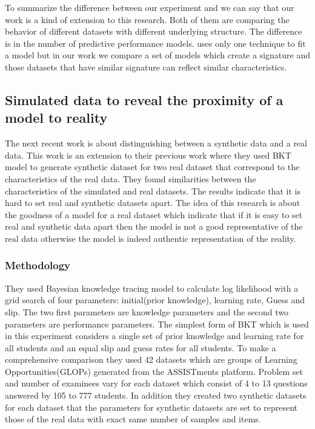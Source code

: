 To summarize the difference between our experiment and \citep{Desmarais2010} we can say that our work is a kind of extension to this research. Both of them are comparing the behavior of different datasets with different underlying structure. The difference is in the number of predictive performance models. \citet{Desmarais2010} uses only one technique to fit a model but in our work we compare a set of models which create a signature and those datasets that have similar signature can reflect similar characteristics.

\subsection{Simulated data to reveal the proximity of a model to reality}

The next recent work \citep{Rosenberg2015} is about distinguishing between a synthetic data and a real data. This work is an extension to their previous work \citep{Rosenberg2014} where they used BKT model to generate synthetic dataset for two real dataset that correspond to the characteristics of the real data. They found similarities between the characteristics of the simulated and real datasets. The results indicate that it is hard to set real and synthetic datasets apart. The idea of this research \citep{Rosenberg2015} is about the goodness of a model for a real dataset which indicate that if it is easy to set real and synthetic data apart then the model is not a good representative of the real data otherwise the model is indeed authentic representation of the reality.

\subsubsection{Methodology}
They used Bayesian knowledge tracing model to calculate log likelihood with a grid search of four parameters: initial(prior knowledge), learning rate, Guess and slip. The two first parameters are knowledge parameters and the second two parameters are performance parameters. The simplest form of BKT which is used in this experiment considers a single set of prior knowledge and  learning rate for all students and an equal slip and guess rates for all students.
To make a comprehensive comparison they used 42 datasets which are groups of Learning Opportunities(GLOPs) generated from the ASSISTments platform. Problem set and number of examinees vary for each dataset which consist of 4 to 13 questions answered by 105 to 777 students. In addition they created two synthetic datasets for each dataset that the parameters for synthetic datasets are set to represent those of the real data with exact same number of samples and items. 

